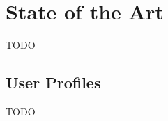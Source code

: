 
%
%

\chapter{State of the Art}

TODO


\section{User Profiles}
\label{chapter:user-profiles}

TODO
